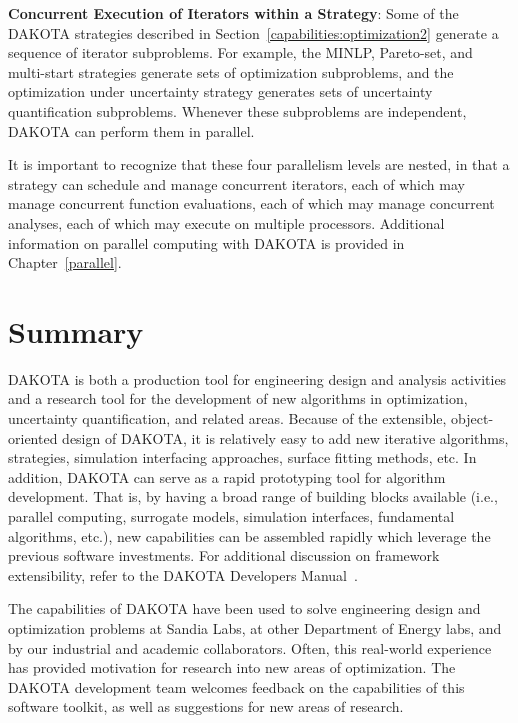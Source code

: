 \textbf{Concurrent Execution of Iterators within a Strategy}: Some of
the DAKOTA strategies described in
Section~\ref{capabilities:optimization2} generate a sequence of
iterator subproblems. For example, the MINLP, Pareto-set, and
multi-start strategies generate sets of optimization subproblems, and
the optimization under uncertainty strategy generates sets of
uncertainty quantification subproblems. Whenever these subproblems are
independent, DAKOTA can perform them in parallel.

It is important to recognize that these four parallelism levels are
nested, in that a strategy can schedule and manage concurrent
iterators, each of which may manage concurrent function evaluations,
each of which may manage concurrent analyses, each of which may
execute on multiple processors. Additional information on parallel
computing with DAKOTA is provided in Chapter~\ref{parallel}.

\section{Summary}\label{capabilities:summary}

DAKOTA is both a production tool for engineering design and analysis
activities and a research tool for the development of new algorithms
in optimization, uncertainty quantification, and related areas.
Because of the extensible, object-oriented design of DAKOTA, it is
relatively easy to add new iterative algorithms, strategies,
simulation interfacing approaches, surface fitting methods, etc. In
addition, DAKOTA can serve as a rapid prototyping tool for algorithm
development. That is, by having a broad range of building blocks
available (i.e., parallel computing, surrogate models, simulation
interfaces, fundamental algorithms, etc.), new capabilities can be
assembled rapidly which leverage the previous software investments.
For additional discussion on framework extensibility, refer to the
DAKOTA Developers Manual~\cite{DevMan}.

The capabilities of DAKOTA have been used to solve engineering design
and optimization problems at Sandia Labs, at other Department of
Energy labs, and by our industrial and academic collaborators. Often,
this real-world experience has provided motivation for research into
new areas of optimization. The DAKOTA development team welcomes
feedback on the capabilities of this software toolkit, as well as
suggestions for new areas of research.

